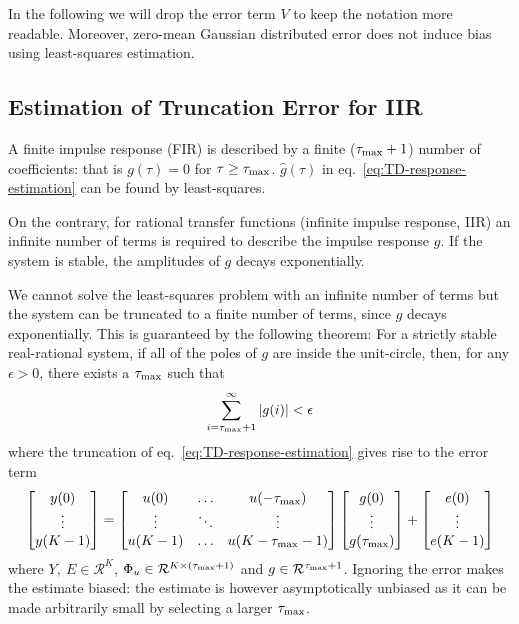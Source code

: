 In the following we will drop the error term $V$ to keep the notation more readable. Moreover, zero-mean Gaussian distributed error does not induce bias using least-squares estimation.

\subsection{Estimation of Truncation Error for IIR}
\label{sec:truncation-error-estimation}

A finite impulse response (FIR) is described by a finite ($\tau_\text{max}+1$) number of coefficients: that is $g(\tau) = 0$ for $\tau \ge \tau_\text{max}$. $\hat{g}(\tau)$ in eq.~\eqref{eq:TD-response-estimation} can be found by least-squares.

On the contrary, for rational transfer functions (infinite impulse response, IIR) an infinite number of terms is required to describe the impulse response $g$. If the system is stable, the amplitudes of $g$ decays exponentially.

We cannot solve the least-squares problem with an infinite number of terms but the system can be truncated to a finite number of terms, since $g$ decays exponentially. This is guaranteed by the following theorem: For a strictly stable real-rational system, if all of the poles of $g$ are inside the unit-circle, then, for any $\epsilon>0$, there exists a $\tau_\text{max}$ such that
\begin{equation*}
  \sum_{i=\tau_\text{max}+1}^\infty |g(i)| < \epsilon
\end{equation*}
where the truncation of eq.~\eqref{eq:TD-response-estimation} gives rise to the error term
\begin{align*}
  \begin{bmatrix}
    y(0) \\ \vdots \\ y(K-1)
  \end{bmatrix} =
  \begin{bmatrix}
    u(0) & \ldots & u(-\tau_\text{max}) \\
    \vdots & \ddots & \vdots \\
    u(K-1) & \ldots & u(K-\tau_\text{max}-1)
  \end{bmatrix}
  \begin{bmatrix}
    g(0) \\ \vdots \\ g(\tau_\text{max})
  \end{bmatrix} +
  \begin{bmatrix}
    e(0) \\ \vdots \\ e(K-1)
  \end{bmatrix}
\end{align*}
where $Y,\ E\in \mathcal{R}^K$, $\Phi_u \in \mathcal{R}^{K\times(\tau_\text{max}+1)}$ and $g \in \mathcal{R}^{\tau_\text{max}+1}$. Ignoring the error makes the estimate biased: the estimate is however asymptotically unbiased as it can be made arbitrarily small by selecting a larger $\tau_\text{max}$.

